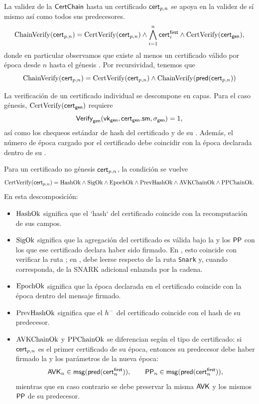 La validez de la $\mathsf{CertChain}$ hasta un certificado $\mathsf{cert}_{p,n}$ se apoya en la validez de sí mismo así como todos sus predecesores.
$$\mathrm{ChainVerify}(\mathsf{cert}_{p,n}) = \mathrm{CertVerify}(\mathsf{cert}_{p,n}) \wedge \bigwedge_{i=1} ^{n} \mathsf{cert}^{\mathsf{first}}_{i} \wedge \mathrm{CertVerify}(\mathsf{cert}_{\mathsf{gen}}),$$
donde en particular observamos que existe al menos un certificado válido por época desde $n$ hasta el génesis \cite{MithrilDocsCertChain}. Por recursividad, tenemos que
$$\mathrm{ChainVerify}(\mathsf{cert}_{p,n}) = \mathrm{CertVerify}(\mathsf{cert}_{p,n}) \wedge \mathrm{ChainVerify}(\mathsf{pred}(\mathsf{cert}_{p,n}))$$

La verificación de un certificado individual se descompone en capas. Para el caso génesis, $\mathrm{CertVerify}(\mathsf{cert}_{\mathsf{gen}})$ requiere
$$\mathsf{Verify}_{\mathsf{gen}}(\mathsf{vk}_{\mathsf{gen}},\mathsf{cert}_{\mathsf{gen}}.\mathsf{sm},\sigma_{\mathsf{gen}})=1,$$
así como los chequeos estándar de hash del certificado y de su \ProtocolMsg. Además, el número de época cargado por el certificado debe coincidir con la época declarada dentro de su \ProtocolMsg.

Para un certificado no génesis \(\mathsf{cert}_{p,n}\), la condición se vuelve
$$\mathrm{CertVerify}(\mathsf{cert}_{p,n}) = \mathrm{HashOk} \wedge \mathrm{SigOk} \wedge \mathrm{EpochOk} \wedge \mathrm{PrevHashOk} \wedge \mathrm{AVKChainOk} \wedge \mathrm{PPChainOk}.$$
En esta descomposición:

\begin{itemize}[noitemsep]
	\item $\mathrm{HashOk}$ significa que el `hash` del certificado coincide con la recomputación de sus campos.
	\item $\mathrm{SigOk}$ significa que la agregación del certificado es válida bajo la \AVK y los $\mathsf{PP}$ con los que ese certificado declara haber sido firmado. En \Pythagoras, esto coincide con verificar la ruta \Concatenation; en \Lagrange, debe leerse respecto de la ruta \texttt{Snark} y, cuando corresponda, de la \AVK SNARK adicional enlazada por la cadena.
	\item $\mathrm{EpochOk}$ significa que la época declarada en el certificado coincide con la época dentro del mensaje firmado.
	\item $\mathrm{PrevHashOk}$ significa que el $h^{-}$ del certificado coincide con el hash de su predecesor.
	\item $\mathrm{AVKChainOk}$ y $\mathrm{PPChainOk}$ se diferencian según el tipo de certificado: si $\mathsf{cert}_{p,n}$ es el primer certificado de su época, entonces su predecesor debe haber firmado la \AVK y los parámetros de la nueva época:
	$$\mathsf{AVK}_n \in \mathsf{msg}(\mathsf{pred}(\mathsf{cert}^{\mathsf{first}}_{n})), \qquad \mathsf{PP}_n \in \mathsf{msg}(\mathsf{pred}(\mathsf{cert}^{\mathsf{first}}_{n})),$$
	mientras que en caso contrario se debe preservar la misma $\mathsf{AVK}$ y los mismos $\mathsf{PP}$ de su predecesor.
\end{itemize}

